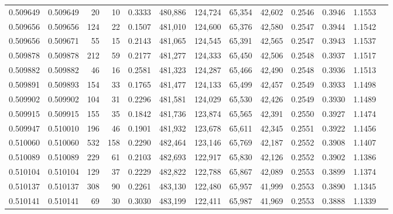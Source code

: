 \begin{tabular}{rrrrrrrrrrrrr}
0.509649 & 0.509649 &    20 &    10 &                                     0.3333 & 480,886 & 124,724 &  65,354 &  42,602 & 0.2546 & 0.3946 & 1.1553 \\
0.509656 & 0.509656 &   124 &    22 &                                     0.1507 & 481,010 & 124,600 &  65,376 &  42,580 & 0.2547 & 0.3944 & 1.1542 \\
0.509656 & 0.509671 &    55 &    15 &                                     0.2143 & 481,065 & 124,545 &  65,391 &  42,565 & 0.2547 & 0.3943 & 1.1537 \\
0.509878 & 0.509878 &   212 &    59 &                                     0.2177 & 481,277 & 124,333 &  65,450 &  42,506 & 0.2548 & 0.3937 & 1.1517 \\
0.509882 & 0.509882 &    46 &    16 &                                     0.2581 & 481,323 & 124,287 &  65,466 &  42,490 & 0.2548 & 0.3936 & 1.1513 \\
0.509891 & 0.509893 &   154 &    33 &                                     0.1765 & 481,477 & 124,133 &  65,499 &  42,457 & 0.2549 & 0.3933 & 1.1498 \\
0.509902 & 0.509902 &   104 &    31 &                                     0.2296 & 481,581 & 124,029 &  65,530 &  42,426 & 0.2549 & 0.3930 & 1.1489 \\
0.509915 & 0.509915 &   155 &    35 &                                     0.1842 & 481,736 & 123,874 &  65,565 &  42,391 & 0.2550 & 0.3927 & 1.1474 \\
0.509947 & 0.510010 &   196 &    46 &                                     0.1901 & 481,932 & 123,678 &  65,611 &  42,345 & 0.2551 & 0.3922 & 1.1456 \\
0.510060 & 0.510060 &   532 &   158 &                                     0.2290 & 482,464 & 123,146 &  65,769 &  42,187 & 0.2552 & 0.3908 & 1.1407 \\
0.510089 & 0.510089 &   229 &    61 &                                     0.2103 & 482,693 & 122,917 &  65,830 &  42,126 & 0.2552 & 0.3902 & 1.1386 \\
0.510104 & 0.510104 &   129 &    37 &                                     0.2229 & 482,822 & 122,788 &  65,867 &  42,089 & 0.2553 & 0.3899 & 1.1374 \\
0.510137 & 0.510137 &   308 &    90 &                                     0.2261 & 483,130 & 122,480 &  65,957 &  41,999 & 0.2553 & 0.3890 & 1.1345 \\
0.510141 & 0.510141 &    69 &    30 &                                     0.3030 & 483,199 & 122,411 &  65,987 &  41,969 & 0.2553 & 0.3888 & 1.1339 \\

\end{tabular}
